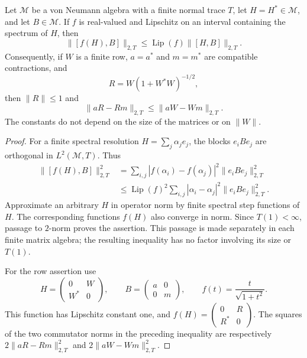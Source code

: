 \begin{lemma}\label{tr:lipschitz}
Let $\mathcal M$ be a von Neumann algebra with a finite normal trace $T$,
let $H=H^*\in\mathcal M$, and let $B\in\mathcal M$.  If $f$ is real-valued
and Lipschitz on an interval containing the spectrum of $H$, then
\[
 \|[f(H),B]\|_{2,T}
 \leq\operatorname{Lip}(f)\|[H,B]\|_{2,T}.
\]
Consequently, if $W$ is a finite row, $a=a^*$ and $m=m^*$ are compatible
contractions, and
\[
 R=W(1+W^*W)^{-1/2},
\]
then $\|R\|\leq1$ and
\[
 \|aR-Rm\|_{2,T}\leq\|aW-Wm\|_{2,T}.
\]
The constants do not depend on the size of the matrices or on $\|W\|$.
\end{lemma}
\begin{proof}
For a finite spectral resolution $H=\sum_j\alpha_j e_j$, the blocks
$e_iBe_j$ are orthogonal in $L^2(\mathcal M,T)$.  Thus
\begin{align*}
 \|[f(H),B]\|_{2,T}^2
 &=\sum_{i,j}|f(\alpha_i)-f(\alpha_j)|^2\|e_iBe_j\|_{2,T}^2\\
 &\leq\operatorname{Lip}(f)^2
       \sum_{i,j}|\alpha_i-\alpha_j|^2\|e_iBe_j\|_{2,T}^2.
\end{align*}
Approximate an arbitrary $H$ in operator norm by finite spectral step
functions of $H$.  The corresponding functions $f(H)$ also converge in
norm.  Since $T(1)<\infty$, passage to $2$-norm proves the assertion.
This passage is made separately in each finite matrix algebra; the
resulting inequality has no factor involving its size or $T(1)$.

For the row assertion use
\[
 H=\begin{pmatrix}0&W\\W^*&0\end{pmatrix},\qquad
 B=\begin{pmatrix}a&0\\0&m\end{pmatrix},\qquad
 f(t)=\frac{t}{\sqrt{1+t^2}}.
\]
This function has Lipschitz constant one, and
$f(H)=\left(\begin{smallmatrix}0&R\\R^*&0\end{smallmatrix}\right)$.
The squares of the two commutator norms in the preceding inequality are
respectively $2\|aR-Rm\|_{2,T}^2$ and
$2\|aW-Wm\|_{2,T}^2$.
\end{proof}


